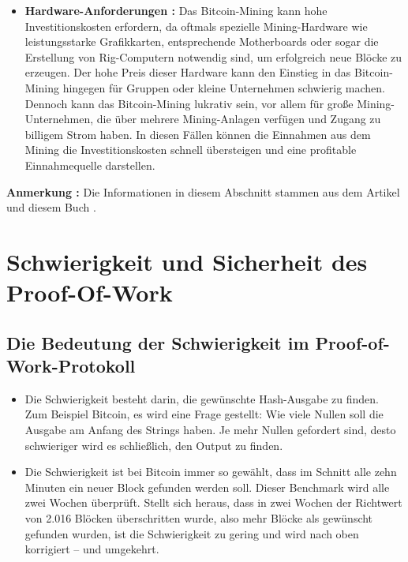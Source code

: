\begin{itemize}
	\item \textbf{Hardware-Anforderungen :} Das Bitcoin-Mining kann hohe Investitionskosten erfordern, da oftmals spezielle Mining-Hardware wie leistungsstarke Grafikkarten, entsprechende Motherboards oder sogar die Erstellung von Rig-Computern notwendig sind, um erfolgreich neue Blöcke zu erzeugen. Der hohe Preis dieser Hardware kann den Einstieg in das Bitcoin-Mining hingegen für Gruppen oder kleine Unternehmen schwierig machen. Dennoch kann das Bitcoin-Mining lukrativ sein, vor allem für große Mining-Unternehmen, die über mehrere Mining-Anlagen verfügen und Zugang zu billigem Strom haben. In diesen Fällen können die Einnahmen aus dem Mining die Investitionskosten schnell übersteigen und eine profitable Einnahmequelle darstellen.
	
\end{itemize}

\textbf{Anmerkung : } Die Informationen in diesem Abschnitt stammen aus dem Artikel \cite{fool} und diesem Buch \cite{kube2018daniel}.
\chapter{Schwierigkeit und Sicherheit des Proof-Of-Work}

\section{Die Bedeutung der Schwierigkeit im Proof-of-Work-Protokoll}
\begin{itemize}
	\item Die Schwierigkeit besteht darin, die gewünschte Hash-Ausgabe zu finden. Zum Beispiel Bitcoin, es wird eine Frage gestellt: Wie viele Nullen soll die Ausgabe am Anfang des Strings haben. Je mehr Nullen gefordert sind, desto schwieriger wird es schließlich, den Output zu finden.
	\item Die Schwierigkeit ist bei Bitcoin immer so gewählt, dass im Schnitt alle zehn Minuten ein neuer Block gefunden werden soll. Dieser Benchmark wird alle zwei Wochen überprüft. Stellt sich heraus, dass in zwei Wochen der Richtwert von 2.016 Blöcken überschritten wurde, also mehr Blöcke als gewünscht gefunden wurden, ist die Schwierigkeit zu gering und wird nach oben korrigiert – und umgekehrt.
\end{itemize}
%

